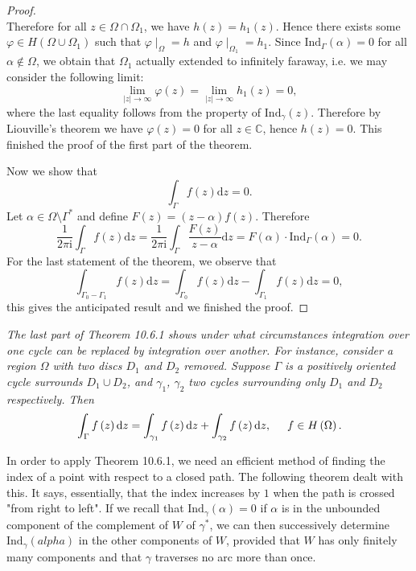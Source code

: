 \begin{proof}
$$$$
Therefore for all $z\in\Omega\cap\Omega_1$, we have $h(z)=h_1(z)$. Hence there exists some $\varphi\in H(\Omega\cup\Omega_1)$ such that $\varphi\mid_\Omega=h$ and $\varphi\mid_{\Omega_1}=h_1$. Since $\mathrm{Ind}_\Gamma(\alpha)=0$ for all $\alpha\notin\Omega$, we obtain that $\Omega_1$ actually extended to infinitely faraway, i.e. we may consider the following limit: 
$$
\lim_{\left| z \right|\rightarrow \infty} \varphi \left( z \right) =\lim_{\left| z \right|\rightarrow \infty} h_1\left( z \right) =0,
$$
where the last equality follows from the property of $\mathrm{Ind}_\gamma(z)$. Therefore by Liouville's theorem we have $\varphi(z)=0$ for all $z\in\mathbb{C}$, hence $h(z)=0$. This finished the proof of the first part of the theorem.\par
Now we show that 
$$\int_\Gamma f(z)\mathrm{d}z=0.$$
Let $\alpha\in\Omega\setminus\Gamma^*$ and define $F(z)=(z-\alpha)f(z)$. Therefore 
$$
\frac{1}{2\pi \mathrm{i}}\int_{\Gamma}{f\left( z \right) \mathrm{d}z}=\frac{1}{2\pi \mathrm{i}}\int_{\Gamma}{\frac{F\left( z \right)}{z-\alpha}\mathrm{d}z}=F\left( \alpha \right) \cdot \mathrm{Ind}_{\Gamma}\left( \alpha \right) =0.
$$
For the last statement of the theorem, we observe that 
$$
\int_{\Gamma _0-\Gamma _1}{f\left( z \right) \mathrm{d}z}=\int_{\Gamma _0}{f\left( z \right) \mathrm{d}z}-\int_{\Gamma _1}{f\left( z \right) \mathrm{d}z}=0,
$$
this gives the anticipated result and we finished the proof.
\end{proof}
\begin{note}\em
The last part of Theorem 10.6.1 shows under what circumstances integration over one cycle can be replaced by integration over another. For instance, consider a region $\Omega$ with two discs $D_1$ and $D_2$ removed. Suppose $\Gamma$ is a positively oriented cycle surrounds $D_1\cup D_2$, and $\gamma_1$, $\gamma_2$ two cycles surrounding only $D_1$ and $D_2$ respectively. Then 
$$
\int_{\Gamma}{f\left( z \right) \mathrm{d}z}=\int_{\gamma _1}{f\left( z \right) \mathrm{d}z}+\int_{\gamma _2}{f\left( z \right) \mathrm{d}z},\hspace{0.5cm}f\in H\left( \Omega \right) .
$$
\end{note}
In order to apply Theorem 10.6.1, we need an efficient method of finding the index of a point with respect to a closed path. The following theorem dealt with this. It says, essentially, that the index increases by $1$ when the path is crossed "from right to left". If we recall that $\mathrm{Ind}_\gamma(\alpha)=0$ if $\alpha$ is in the unbounded component of the complement of $W$ of $\gamma^*$, we can then successively determine $\mathrm{Ind}_\gamma(alpha)$ in the other components of $W$, provided that $W$ has only finitely many components and that $\gamma$ traverses no arc more than once.
